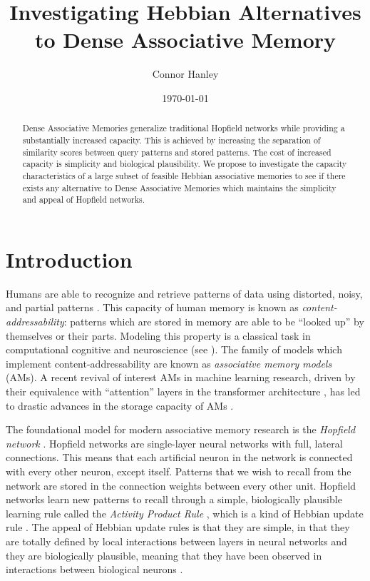 \documentclass{article}
\title{Investigating Hebbian Alternatives to Dense Associative Memory}
\author{Connor Hanley}
\date{\today}
\theoremstyle{definition}
\begin{document}
\maketitle

\begin{abstract}
  Dense Associative Memories generalize traditional Hopfield networks
  while providing a substantially increased capacity. This is achieved by increasing
  the separation of similarity scores between query patterns and stored patterns.
  The cost of increased capacity is simplicity and biological plausibility. We propose
  to investigate the capacity characteristics of a large subset of feasible Hebbian
  associative memories to see if there exists any alternative to
  Dense Associative Memories which maintains the simplicity and
  appeal of Hopfield networks.
\end{abstract}

\section{Introduction}

Humans are able to recognize and retrieve patterns of data using distorted,
noisy, and partial patterns \parencite{rumelhart_general_1986}. This
capacity of human memory is known as \textit{content-addressability}: patterns
which are stored in memory are able to be ``looked up'' by themselves or their
parts. Modeling this property is a classical task in computational cognitive
and neuroscience (see \textcites{marr_simple_1971,little_existence_1974,
amari_learning_1972,nakano_associatron-model_1972,stanley_simulation_1976}).
The family of models which implement content-addressability are known
as \textit{associative memory models} (AMs).
A recent revival of interest AMs in machine learning research,
driven by their equivalence with ``attention'' layers in the transformer
architecture \parencites{vaswani_attention_2023, ramsauer_hopfield_2021},
has led to drastic advances in the storage capacity of AMs
\parencites{demircigil_model_2017,krotov_dense_2016,hu_provably_2024}.

The foundational model for modern associative memory research is the
\textit{Hopfield network}
\parencites{hopfield_neural_1982,hopfield_neurons_1984}.
Hopfield networks are single-layer neural networks with full, lateral
connections.
This means that each artificial neuron in the network is connected with every
other neuron, except itself. Patterns that we wish to recall from the network
are stored in the connection weights between every other unit. Hopfield
networks learn new patterns to recall through a simple, biologically plausible
learning rule called the \textit{Activity Product Rule}
\parencite{haykin_neural_2009},
which is a kind of Hebbian update rule \parencite{hebb_organization_1949}.
The appeal of Hebbian update rules is that they are simple, in that they
are totally defined by local interactions between layers in neural networks
and they are biologically plausible, meaning that they have been observed in interactions
between biological neurons
\parencites{rolls_mechanisms_2013,bi_synaptic_1998,markram_regulation_1997}.
\end{document}
